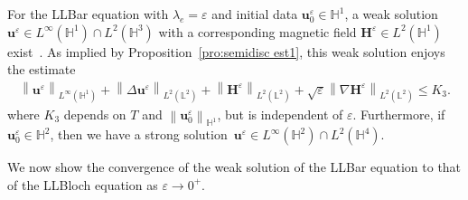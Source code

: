 \documentclass[11pt, reqno]{amsart}
\theoremstyle{definition}
\theoremstyle{remark}
\numberwithin{equation}{section}
\newcommand{\bff}{\boldsymbol}
\newcommand{\bb}{\mathbb}
\newcommand{\norm}[2]{\left\|{#1}\right\|_{#2}}
\begin{document}
For the LLBar equation with $\lambda_e=\varepsilon$ and initial data $\bff{u}_0^\varepsilon\in \bb{H}^1$, a weak solution~$\bff{u}^\varepsilon\in L^\infty(\bb{H}^1) \cap L^2(\bb{H}^3)$ with a corresponding magnetic field $\bff{H}^\varepsilon\in L^2(\bb{H}^1)$ exist~\cite{SoeTra23}. As implied by Proposition~\ref{pro:semidisc est1}, this weak solution enjoys the estimate
\begin{align}\label{equ:ue est}
	\norm{\bff{u}^\varepsilon}{L^\infty(\bb{H}^1)} 
	+
	\norm{\Delta \bff{u}^\varepsilon}{L^2(\bb{L}^2)}
	+
	\norm{\bff{H}^\varepsilon}{L^2(\bb{L}^2)}
	+
	\sqrt{\varepsilon} \norm{\nabla \bff{H}^\varepsilon}{L^2(\bb{L}^2)}
	\leq
	K_3.
\end{align}
where $K_3$ depends on $T$ and $\norm{\bff{u}_0^\varepsilon}{\bb{H}^1}$, but is independent of $\varepsilon$. Furthermore, if $\bff{u}_0^\varepsilon\in \bb{H}^2$, then we have a strong solution~$\bff{u}^\varepsilon\in L^\infty(\bb{H}^2)\cap L^2(\bb{H}^4)$.

We now show the convergence of the weak solution of the LLBar equation to that of the LLBloch equation as $\varepsilon \to 0^+$.
\end{document}
